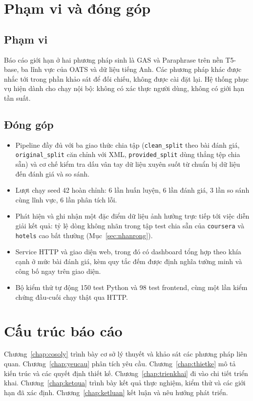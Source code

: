 \documentclass[12pt,a4paper]{report}
\newcommand{\code}[1]{\texttt{#1}}
\begin{document}
\section{Phạm vi và đóng góp}

\subsection{Phạm vi}

Báo cáo giới hạn ở hai phương pháp sinh là GAS và Paraphrase trên nền T5-base, ba lĩnh vực của OATS và dữ liệu tiếng Anh.
Các phương pháp khác được nhắc tới trong phần khảo sát để đối chiếu, không được cài đặt lại. Hệ thống phục vụ hiện dành
cho chạy nội bộ: không có xác thực người dùng, không có giới hạn tần suất.

\subsection{Đóng góp}

\begin{itemize}
  \item Pipeline đầy đủ với ba giao thức chia tập (\code{clean\_split} theo bài đánh giá, \code{original\_split} căn
        chỉnh với XML, \code{provided\_split} dùng thẳng tệp chia sẵn) và cơ chế kiểm tra dấu vân tay dữ liệu xuyên suốt
        từ chuẩn bị dữ liệu đến đánh giá và so sánh.
  \item Lượt chạy seed 42 hoàn chỉnh: 6 lần huấn luyện, 6 lần đánh giá, 3 lần so sánh cùng lĩnh vực, 6 lần phân tích lỗi.
  \item Phát hiện và ghi nhận một đặc điểm dữ liệu ảnh hưởng trực tiếp tới việc diễn giải kết quả: tỷ lệ dòng không nhãn
        trong tập test chia sẵn của \code{coursera} và \code{hotels} cao bất thường (Mục~\ref{sec:nhanrong}).
  \item Service HTTP và giao diện web, trong đó có dashboard tổng hợp theo khía cạnh ở mức bài đánh giá, kèm quy tắc đếm
        được định nghĩa tường minh và công bố ngay trên giao diện.
  \item Bộ kiểm thử tự động 150 test Python và 98 test frontend, cùng một lần kiểm chứng đầu-cuối chạy thật qua HTTP.
\end{itemize}

\section{Cấu trúc báo cáo}

Chương~\ref{chap:cosoly} trình bày cơ sở lý thuyết và khảo sát các phương pháp liên quan. Chương~\ref{chap:yeucau} phân
tích yêu cầu. Chương~\ref{chap:thietke} mô tả kiến trúc và các quyết định thiết kế. Chương~\ref{chap:trienkhai} đi vào
chi tiết triển khai. Chương~\ref{chap:ketqua} trình bày kết quả thực nghiệm, kiểm thử và các giới hạn đã xác định.
Chương~\ref{chap:ketluan} kết luận và nêu hướng phát triển.
\end{document}
